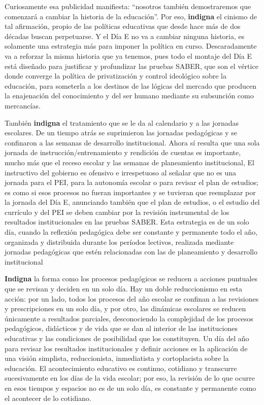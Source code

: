 \documentclass[10pt]{article}
\begin{document}
Curiosamente esa publicidad manifiesta: “nosotros también demostraremos que comenzará a cambiar la historia de la educación”. Por eso, \textbf{indigna} el cinismo de tal afirmación, propio de las políticas educativas que desde hace más de dos décadas buscan perpetuarse. Y el Día E no va a cambiar ninguna historia, es solamente una estrategia más para imponer la política en curso. Descaradamente va a reforzar la misma historia que ya tenemos, pues todo el montaje del Día E está diseñado para justificar y profundizar las pruebas SABER,
que son el vértice donde converge la política de privatización y control ideológico sobre la educación, para someterla a los destinos de las lógicas del mercado que producen la
enajenación del conocimiento y del ser humano mediante su subsunción como mercancías.

También \textbf{indigna} el tratamiento que se le da al calendario y a las jornadas escolares. De un tiempo atrás se suprimieron las jornadas pedagógicas y se confinaron a las semanas de desarrollo institucional. Ahora sí resulta que una sola jornada de instrucción/entrenamiento y rendición de cuentas es importante, mucho más que el receso escolar y las semanas de planeamiento institucional, El instructivo del gobierno es ofensivo e irrespetuoso al señalar que no es una jornada para el PEI, para la autonomía escolar o para revisar el plan de estudios; es como si esos procesos no fueran importantes y se tuvieran que reemplazar por la jornada del Día E, anunciando también que el plan de estudios, o el estudio del currículo y del PEI se deben cambiar por la revisión instrumental de los resultados institucionales en las pruebas SABER. Esta estrategia es de un solo día, cuando la reflexión pedagógica debe ser constante y permanente todo el año, organizada y distribuida durante los períodos lectivos, realizada mediante jornadas pedagógicas que estén relacionadas con las de planeamiento y desarrollo institucional

\textbf{Indigna} la forma como los procesos pedagógicos se reducen a acciones puntuales que se revisan y deciden en un solo día. Hay un doble reduccionismo en esta acción: por un lado, todos los procesos del año escolar se confinan a las revisiones y prescripciones en un solo día, y por otro, las dinámicas escolares se reducen únicamente a resultados parciales, desconociendo la complejidad de los procesos pedagógicos, didácticos y de vida que se dan al interior de las instituciones educativas y las condiciones de posibilidad que los constituyen. Un día del año para revisar los resultados institucionales y definir acciones es la aplicación de una visión simplista, reduccionista, inmediatista y cortoplacista sobre la educación. El acontecimiento educativo es continuo, cotidiano y transcurre sucesivamente en los días de la vida escolar; por eso, la revisión de lo que ocurre en esos tiempos y espacios no es de un solo día, es constante y permanente como el acontecer de lo cotidiano. 
\end{document}

